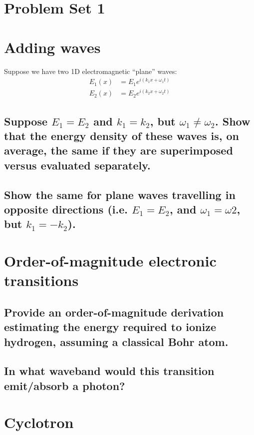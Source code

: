 \documentclass[11pt]{article}
\begin{document}
\pagestyle{empty}
\parindent=0pt

\section*{\centering Problem Set 1}

\section{Adding waves}
Suppose we have two 1D electromagnetic ``plane'' waves:
\begin{eqnarray}
E_1(x) &= E_1e^{i(k_1x+\omega_1 t)}\nonumber\\
E_2(x) &= E_2e^{i(k_2x+\omega_2 t)}\nonumber
\end{eqnarray}
\subsection{Suppose $E_1=E_2$ and $k_1=k_2$, but $\omega_1\ne\omega_2$.  Show that the energy density
of these waves is, on average, the same if they are superimposed versus evaluated separately.}
\vspace{0.25in}
\subsection{Show the same for plane waves travelling in opposite directions (i.e.
$E_1=E_2$, and $\omega_1=\omega2$, but $k_1=-k_2$).}

\section{Order-of-magnitude electronic transitions}

\subsection{Provide an order-of-magnitude derivation estimating the energy required to ionize hydrogen,
assuming a classical Bohr atom.}
\vspace{0.25in}
\subsection{In what waveband would this transition emit/absorb a photon?}
\vspace{0.25in}

\section{Cyclotron}
\end{document}
